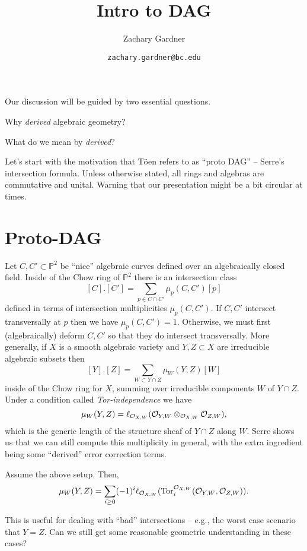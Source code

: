 \documentclass[11pt]{article}
\renewcommand{\P}{\mathbb{P}}
\begin{document}
\title{Intro to DAG}
\author{Zachary Gardner}
\date{\texttt{zachary.gardner@bc.edu}}
\maketitle

\thispagestyle{fancydate}

Our discussion will be guided by two essential questions.
\begin{enum}{\arabic}
\item Why \emph{derived} algebraic geometry?
\item What do we mean by \emph{derived}?
\end{enum}
Let's start with the motivation that T\"{o}en refers to as ``proto DAG'' -- Serre's intersection formula. Unless otherwise stated, all rings and algebras are commutative and unital. Warning that our presentation might be a bit circular at times.

\section{Proto-DAG}
Let $C,C'\subset\P^2$ be ``nice'' algebraic curves defined over an algebraically closed field. Inside of the Chow ring of $\P^2$ there is an intersection class
$$[C].[C']=\sum_{p\in C\cap C'}\mu_p(C,C')[p]$$
defined in terms of intersection multiplicities $\mu_p(C,C')$. If $C,C'$ intersect transversally at $p$ then we have $\mu_p(C,C')=1$. Otherwise, we must first (algebraically) deform $C,C'$ so that they do intersect transversally. More generally, if $X$ is a smooth algebraic variety and $Y,Z\subset X$ are irreducible algebraic subsets then 
$$[Y].[Z]=\sum_{W\subset Y\cap Z}\mu_W(Y,Z)[W]$$
inside of the Chow ring for $X$, summing over irreducible components $W$ of $Y\cap Z$. Under a condition called \emph{Tor-independence} we have
$$\mu_W(Y,Z)=\ell_{\mathcal{O}_{X,W}}(\mathcal{O}_{Y,W}\otimes_{\mathcal{O}_{X,W}}\mathcal{O}_{Z,W}),$$
which is the generic length of the structure sheaf of $Y\cap Z$ along $W$. Serre shows us that we can still compute this multiplicity in general, with the extra ingredient being some ``derived'' error correction terms.

\begin{theorem}
Assume the above setup. Then,
$$\mu_W(Y,Z)=\sum_{i\geq0}(-1)^i\ell_{\mathcal{O}_{X,W}}(\operatorname{Tor}_i^{\mathcal{O}_{X,W}}(\mathcal{O}_{Y,W},\mathcal{O}_{Z,W})).$$
\end{theorem}

This is useful for dealing with ``bad'' intersections -- e.g., the worst case scenario that $Y=Z$. Can we still get some reasonable geometric understanding in these cases?
\end{document}
